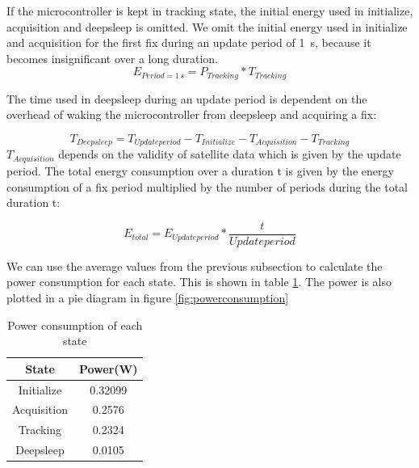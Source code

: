 If the microcontroller is kept in tracking state, the initial energy used in initialize, acquisition and deepsleep is omitted. We omit the initial energy used in initialize and acquisition for the first fix during an update period of 1 \,s, because it becomes insignificant over a long duration. 
\begin{equation}
E_{Period = 1 \,s} = P_{Tracking}*T_{Tracking}
\end{equation}
\label{equation:1s}


The time used in deepsleep during an update period is dependent on the overhead of waking the microcontroller from deepsleep and acquiring a fix:

\begin{equation}
T_{Deepsleep} = T_{Updateperiod} - T_{Initialize} - T_{Acquisition} - T_{Tracking}
\end{equation}
\label{equation:energydeepsleep}
$T_ {Acquisition}$ depends on the validity of satellite data which is given by the update period. The total energy consumption over a duration t is given by the energy consumption of a fix period multiplied by the number of periods during the total duration t:

\begin{equation}
 E_{total} = E_{Updateperiod}* \frac{t}{Updateperiod}
\end{equation}
\label{equation:energytotal}

 We can use the average values from the previous subsection to calculate the power consumption for each state. This is shown in table  \ref{Table:data for the energy model}. The power is also plotted in a pie diagram in figure \ref{fig:powerconsumption}
\begin{table}[h!]
\begin{center}
 \begin{tabular}{||c c||} 
 \hline
  State &  Power(W) \\ [0.5ex] 
 \hline\hline
  Initialize & 0.32099 \\ 
 \hline
 Acquisition & 0.2576 \\
 \hline
 Tracking & 0.2324 \\
 \hline
 Deepsleep & 0.0105 \\
 [1ex]
 \hline
\end{tabular}
\end{center}
\caption{Power consumption of each state}
\label{Table:data for the energy model}
\end{table}

